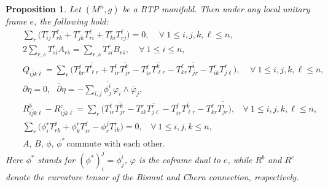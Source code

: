 \documentclass{amsart}
\numberwithin{equation}{section}
\newtheorem{proposition}[theorem]{Proposition}
\theoremstyle{definition}
\renewcommand{\1}{\mathds{1}}
\renewcommand{\>}{\rightarrow}
\begin{document}
\begin{proposition} \label{prop1.5}
Let $(M^n,g)$ be a BTP manifold. Then under any local unitary frame $e$, the following hold:
\begin{eqnarray}
&&  \sum_r \big( T^r_{ij}T^{\ell}_{r k} + T^r_{jk}T^{\ell}_{ri} + T^r_{ki}T^{\ell}_{rj}\big) =0,  \ \ \ \ \ \forall \ 1\leq i,j,k,\ell \leq n, \label{eq:1.5} \\
&& 2 \sum_{r,s} T^r_{si} A_{r\bar{s}} =  \sum_{r,s} T^r_{si} B_{r\bar{s}} , \ \ \ \ \ \forall \ 1\leq i\leq n, \label{eq:1.6} \\
&& Q_{i\bar{j}k\bar{\ell}}  = \sum_r \big( T^j_{kr} \overline{ T^i_{\ell r} } + T^{\ell}_{ir} \overline{ T^k_{j r} } - T^j_{ir} \overline{ T^k_{\ell r} } - T^{\ell}_{kr} \overline{ T^i_{j r} } - T^r_{ik} \overline{ T^r_{j\ell } } \big) ,\ \ \ \ \ \forall \ 1\leq i,j,k,\ell \leq n, \label{eq:1.7} \\
&& \partial \eta =0, \ \ \ \overline{\partial } \eta = - \sum_{i,j} \overline{\phi^i_j }\,\varphi_i \wedge \overline{\varphi}_j, \label{eq:1.8}\\
&& R^b_{i\bar{j}k\bar{\ell}} - R^c_{i\bar{j}k\bar{\ell}} = \sum_r \big( T^{\ell}_{ir} \overline{T^{k}_{jr}} -T^{r}_{ik} \overline{T^{r}_{j\ell }} - T^{j}_{ir} \overline{T^{k}_{\ell r}} - T^{\ell}_{kr} \overline{T^{i}_{jr}}\big) , \ \ \ \ \forall \ 1\leq i,j,k,\ell \leq n, \label{eq:1.9}\\
&& \sum_r \big( \phi^r_i T^j_{rk} + \phi^r_k T^j_{ir} - \phi^j_r T^r_{ik} \big) = 0, \ \  \ \ \forall \ 1\leq i,j,k\leq n, \label{eq:1.10}\\
&& A, \,B, \,\phi, \,\phi^{\ast} \, \mbox{commute with each other}. \label{eq:1.11}
\end{eqnarray}
Here $\phi^{\ast}$ stands for $ (\phi^{\ast})^j_i = \overline{\phi^i_j}$, $\varphi$ is the coframe dual to $e$, while $R^b$ and $R^c$ denote the curvature tensor of the Bismut and Chern connection, respectively.
\end{proposition}
\end{document}
